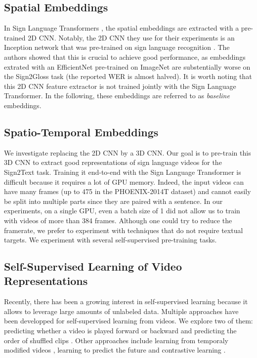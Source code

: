 \documentclass[final]{cvpr}
\begin{document}
\subsection{Spatial Embeddings}

In Sign Language Transformers \cite{neccam}, the spatial embeddings are extracted with a pre-trained 2D CNN. Notably, the 2D CNN they use for their experiments is an Inception network that was pre-trained on sign language recognition \cite{hmm}. The authors \cite{neccam} showed that this is crucial to achieve good performance, as embeddings extrated with an EfficientNet \cite{effnet} pre-trained on ImageNet are substentially worse on the Sign2Gloss task (the reported WER is almost halved).
It is worth noting that this 2D CNN feature extractor is not trained jointly with the Sign Language Transformer. In the following, these embeddings are referred to as \textit{baseline} embeddings.
\subsection{Spatio-Temporal Embeddings}
We investigate replacing the 2D CNN by a 3D CNN. Our goal is to pre-train this 3D CNN to extract good representations of sign language videos for the Sign2Text task. Training it end-to-end with the Sign Language Transformer is difficult because it requires a lot of GPU memory. Indeed, the input videos can have many frames (up to 475 in the PHOENIX-2014T \cite{phoenix} dataset) and cannot easily be split into multiple parts since they are paired with a sentence. In our experiments, on a single GPU, even a batch size of 1 did not allow us to train with videos of more than 384 frames. Although one could try to reduce the framerate, we prefer to experiment with techniques that do not require textual targets. We experiment with several self-supervised pre-training tasks.
\subsection{Self-Supervised Learning of Video Representations}
Recently, there has been a growing interest in self-supervised learning because it allows to leverage large amounts of unlabeled data. Multiple approaches have been developped for self-supervised learning from videos. We explore two of them: predicting whether a video is played forward or backward \cite{arrow} and predicting the order of shuffled clips \cite{vcop}. Other approaches include learning from temporaly modified videos \cite{playback-rate, pace, temp-trans}, learning to predict the future \cite{pred-coding} and contrastive learning \cite{contrast, bert-video}.
\end{document}
